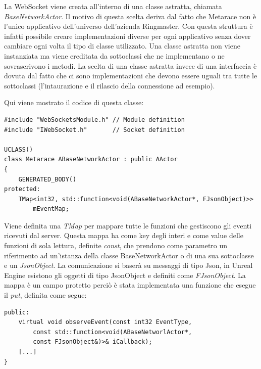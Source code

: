 La WebSocket viene creata all'interno di una classe astratta, chiamata \textit{BaseNetworkActor}.
%
Il motivo di questa scelta deriva dal fatto che Metarace non è l'unico applicativo dell'universo dell'azienda Ringmaster.
%
Con questa struttura è infatti possibile creare implementazioni diverse per ogni applicativo senza dover cambiare ogni volta il tipo di classe utilizzato.
%
Una classe astratta non viene instanziata ma viene ereditata da sottoclassi che ne implementano o ne sovrascrivono i metodi.
%
La scelta di una classe astratta invece di una interfaccia è dovuta dal fatto che ci sono implementazioni che devono essere uguali tra tutte le sottoclassi (l'intaurazione e il rilascio della connessione ad esempio).

Qui viene mostrato il codice di questa classe:

\begin{lstlisting}[caption = Sezione del file header di BaseNetworkActor dove vengono importati i moduli necessari alla WebSocket e viene definita la mappa degli eventi]
#include "WebSocketsModule.h" // Module definition
#include "IWebSocket.h"       // Socket definition

UCLASS()
class Metarace ABaseNetworkActor : public AActor
{
    GENERATED_BODY()
protected:
    TMap<int32, std::function<void(ABaseNetworkActor*, FJsonObject)>> 
        mEventMap;
\end{lstlisting}

Viene definita una \textit{TMap} per mappare tutte le funzioni che gestiscono gli eventi ricevuti dal server.
%
Questa mappa ha come key degli interi e come value delle funzioni di sola lettura, definite \textit{const}, che prendono come parametro un riferimento ad un'istanza della classe BaseNetworkActor o di una sua sottoclasse e un \textit{JsonObject}.
%
La comunicazione si baserà su messaggi di tipo Json, in Unreal Engine esistono gli oggetti di tipo JsonObject e definiti come \textit{FJsonObject}.
%
La mappa è un campo protetto perciò è stata implementata una funzione che esegue il \textit{put}, definita come segue:

\begin{lstlisting}[firstnumber=11, caption = Sezione del file header di BaseNetworkActor dove viene definita la funzione che esegue il put nella mappa degli eventi]
public:
    virtual void observeEvent(const int32 EventType,
        const std::function<void(ABaseNetworlActor*, 
        const FJsonObject&)>& iCallback);
    [...]  
}
\end{lstlisting}

